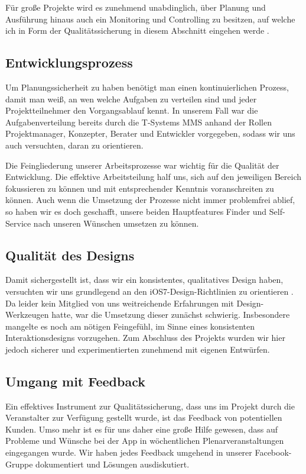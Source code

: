 	Für große Projekte wird es zunehmend unabdinglich, über Planung und Ausführung hinaus auch ein Monitoring und Controlling zu besitzen, auf welche ich in Form der Qualitätssicherung in diesem Abschnitt eingehen werde \citep{PMI08}.

\subsection{Entwicklungsprozess}
	Um Planungssicherheit zu haben benötigt man einen kontinuierlichen Prozess, damit man weiß, an wen welche Aufgaben zu verteilen sind und jeder Projektteilnehmer den Vorgangsablauf kennt. In unserem Fall war die Aufgabenverteilung bereits durch die T-Systems MMS anhand der Rollen Projektmanager, Konzepter, Berater und Entwickler vorgegeben, sodass wir uns auch versuchten, daran zu orientieren. 
	
	Die Feingliederung unserer Arbeitsprozesse war wichtig für die Qualität der Entwicklung. Die effektive Arbeitsteilung half uns, sich auf den jeweiligen Bereich fokussieren zu können und mit entsprechender Kenntnis voranschreiten zu können. Auch wenn die Umsetzung der Prozesse nicht immer problemfrei ablief, so haben wir es doch geschafft, unsere beiden Hauptfeatures Finder und Self-Service nach unseren Wünschen umsetzen zu können.

\subsection{Qualität des Designs}
	Damit sichergestellt ist, dass wir ein konsistentes, qualitatives Design haben, versuchten wir uns grundlegend an den iOS7-Design-Richtlinien zu orientieren \citep{Apple14}. Da leider kein Mitglied von uns weitreichende Erfahrungen mit Design-Werkzeugen hatte, war die Umsetzung dieser zunächst schwierig. Insbesondere mangelte es noch am nötigen Feingefühl, im Sinne eines konsistenten Interaktionsdesigns vorzugehen. Zum Abschluss des Projekts wurden wir hier jedoch sicherer und experimentierten zunehmend mit eigenen Entwürfen.

\subsection{Umgang mit Feedback}
	Ein effektives Instrument zur Qualitätssicherung, dass uns im Projekt durch die Veranstalter zur Verfügung gestellt wurde, ist das Feedback von potentiellen Kunden. Umso mehr ist es für uns daher eine große Hilfe gewesen, dass auf Probleme und Wünsche bei der App in wöchentlichen Plenarveranstaltungen eingegangen wurde. Wir haben jedes Feedback umgehend in unserer Facebook-Gruppe dokumentiert und Lösungen ausdiskutiert.
	
